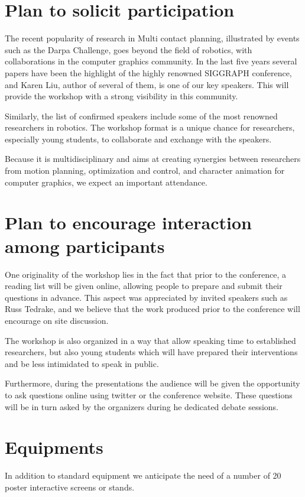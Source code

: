 \documentclass[conference]{IEEEtran}
\begin{document}
\section{Plan to solicit participation}
The recent popularity of research in Multi contact planning, illustrated by events such as the Darpa Challenge, goes beyond the field of robotics, with collaborations in the computer graphics community. In the last five years several papers have been the highlight of the highly renowned SIGGRAPH conference, and Karen Liu, author of several of them, is one of our key speakers. This will provide the workshop with a strong visibility in this community.

Similarly, the list of confirmed speakers include some of the most renowned researchers in robotics.
The workshop format is a unique chance for researchers, especially young students, to collaborate and exchange with the speakers.

Because it is multidisciplinary and aims at creating synergies between researchers from motion planning, optimization and control, and character animation for computer graphics, we expect an important attendance.

\section{Plan to encourage interaction among participants}
One originality of the workshop lies in the fact that prior to the conference, a reading list will be given online, allowing people to prepare and submit their questions in advance. This aspect was appreciated by invited speakers such as Russ Tedrake, and we believe that the work produced prior to the conference will encourage on site discussion.

The workshop is also organized in a way that allow speaking time to established researchers, but also young students which will have prepared their interventions and be less intimidated to speak in public.

Furthermore, during the presentations the audience will be given the opportunity to ask questions online using twitter or the conference website. These questions will be in turn asked by the organizers during he dedicated debate sessions.

\section{Equipments}
In addition to standard equipment we
anticipate the need of a number of 20 poster interactive screens
or stands.
\end{document}
